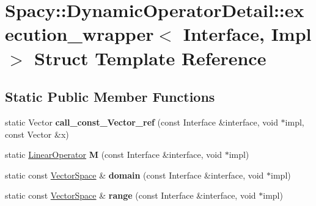 \hypertarget{structSpacy_1_1DynamicOperatorDetail_1_1execution__wrapper}{\section{\-Spacy\-:\-:\-Dynamic\-Operator\-Detail\-:\-:execution\-\_\-wrapper$<$ \-Interface, \-Impl $>$ \-Struct \-Template \-Reference}
\label{structSpacy_1_1DynamicOperatorDetail_1_1execution__wrapper}
}
\subsection*{\-Static \-Public \-Member \-Functions}
\begin{DoxyCompactItemize}
\item 
\hypertarget{structSpacy_1_1DynamicOperatorDetail_1_1execution__wrapper_a1e053dc332f6ba4a9fb0bfb29591fb78}{static \-Vector {\bfseries call\-\_\-const\-\_\-\-Vector\-\_\-ref} (const \-Interface \&interface, void $\ast$impl, const \-Vector \&x)}\label{structSpacy_1_1DynamicOperatorDetail_1_1execution__wrapper_a1e053dc332f6ba4a9fb0bfb29591fb78}

\item 
\hypertarget{structSpacy_1_1DynamicOperatorDetail_1_1execution__wrapper_a465762fa94e97542be96fa658a95041a}{static \hyperlink{classSpacy_1_1LinearOperator}{\-Linear\-Operator} {\bfseries \-M} (const \-Interface \&interface, void $\ast$impl)}\label{structSpacy_1_1DynamicOperatorDetail_1_1execution__wrapper_a465762fa94e97542be96fa658a95041a}

\item 
\hypertarget{structSpacy_1_1DynamicOperatorDetail_1_1execution__wrapper_a03b11f9d8ad828b97857ebc37a9c1a17}{static const \hyperlink{classSpacy_1_1VectorSpace}{\-Vector\-Space} \& {\bfseries domain} (const \-Interface \&interface, void $\ast$impl)}\label{structSpacy_1_1DynamicOperatorDetail_1_1execution__wrapper_a03b11f9d8ad828b97857ebc37a9c1a17}

\item 
\hypertarget{structSpacy_1_1DynamicOperatorDetail_1_1execution__wrapper_aea530027b9c2ced4285608b0b3f5b7f2}{static const \hyperlink{classSpacy_1_1VectorSpace}{\-Vector\-Space} \& {\bfseries range} (const \-Interface \&interface, void $\ast$impl)}\label{structSpacy_1_1DynamicOperatorDetail_1_1execution__wrapper_aea530027b9c2ced4285608b0b3f5b7f2}

\end{DoxyCompactItemize}
